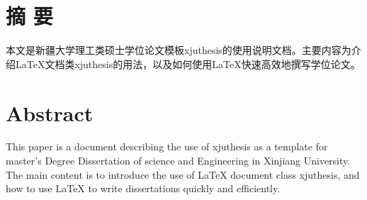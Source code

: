 \author{刘庆飞}%
\maketitle%
\chapter{摘 \quad 要}
\setcounter{page}{1}%

本文是新疆大学理工类硕士学位论文模板xjuthesis的使用说明文档。主要内容为介绍\LaTeX{}文档类xjuthesis的用法，以及如何使用\LaTeX{}快速高效地撰写学位论文。


\chapter{Abstract}%

This paper is a document describing the use of xjuthesis as a template for master's Degree Dissertation of science and Engineering in Xinjiang University. The main content is to introduce the use of \LaTeX{} document class xjuthesis, and how to use \LaTeX{} to write dissertations quickly and efficiently.

